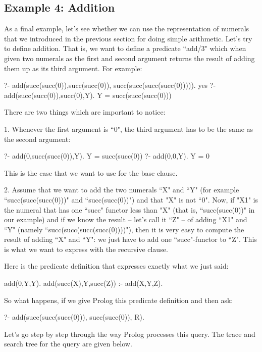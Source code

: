\subsection*{Example 4: Addition}\label{SUBSEC.L3.EX4}



As a final example, let's see whether we can use the representation of
numerals that we introduced in the previous section for doing simple
arithmetic. Let's try to define addition. That is, we want to define a
predicate ``add/3" which when given two numerals as the
first and second argument returns the result of adding them up as its
third argument. For example:
\begin{LPNcodedisplay}
?- add(succ(succ(0)),succ(succ(0)),
       succ(succ(succ(succ(0))))).
yes
?- add(succ(succ(0)),succ(0),Y).
Y = succ(succ(succ(0)))
\end{LPNcodedisplay}

There are two things which are important to notice:

1. Whenever the first argument is ``0", the third argument has
to be the same as the second argument:
\begin{LPNcodedisplay}
?- add(0,succ(succ(0)),Y).
Y = succ(succ(0))
?- add(0,0,Y).
Y = 0
\end{LPNcodedisplay}

This is the case that we want to use for the base clause.

2. Assume that we want to add the two numerals ``X" and ``Y"
(for example  ``succ(succ(succ(0)))" and ``succ(succ(0))") and that
"X" is not ``0". Now, if
"X1" is the numeral that has one ``succ" functor less than
"X" (that is, ``succ(succ(0))" in our example) and if we know the
result -- let's call it ``Z" -- of adding ``X1" and ``Y"
(namely ``succ(succ(succ(succ(0))))"), then it is very easy to
compute the result of adding ``X" and ``Y": we just have to
add one ``succ"-functor to ``Z". This is what we want to
express with the recursive clause.


Here is the predicate definition that expresses exactly what we just said:
\begin{LPNcodedisplay}
add(0,Y,Y).
add(succ(X),Y,succ(Z)) :-
        add(X,Y,Z).
\end{LPNcodedisplay}

So what happens, if we give Prolog this predicate definition and then
ask:
\begin{LPNcodedisplay}
?- add(succ(succ(succ(0))), succ(succ(0)), R).
\end{LPNcodedisplay}
 Let's go step by step through the way Prolog processes this
query. The trace and search tree for the query are given below.

